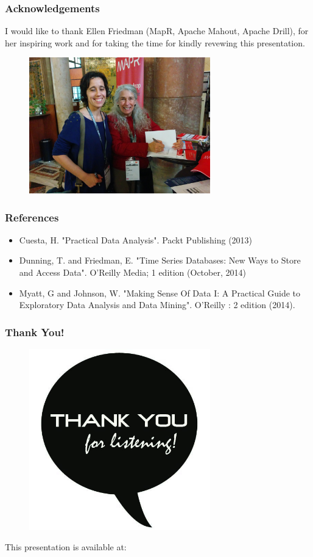 \documentclass[hyperref={pdfpagelabels=true}]{beamer}
\begin{document}
\begin{frame}
\frametitle{Acknowledgements}
I would like to thank Ellen Friedman (MapR, Apache Mahout, Apache Drill), for her inspiring work and for taking the time for kindly revewing this presentation.
    \begin{figure}   
      \includegraphics[width=0.7\textwidth]{nosql_matters.jpg}      
    \end{figure}   
\end{frame}

\begin{frame}
\frametitle{References}
\begin{itemize}
\item Cuesta, H. "Practical Data Analysis". Packt Publishing (2013)
\item Dunning, T. and Friedman, E. "Time Series Databases: New Ways to Store and Access Data". O'Reilly Media; 1 edition (October, 2014)
\item Myatt, G and Johnson, W. "Making Sense Of Data I: A Practical Guide to Exploratory Data Analysis and Data Mining". O'Reilly : 2 edition (2014).
\end{itemize}
\end{frame}

\begin{frame}
\frametitle{Thank You!}
    \begin{figure}   
      \includegraphics[width=0.7\textwidth]{thanks.jpg}      
    \end{figure}   
    This presentation is available at:\\
    \url{}
\end{frame}
\end{document}
